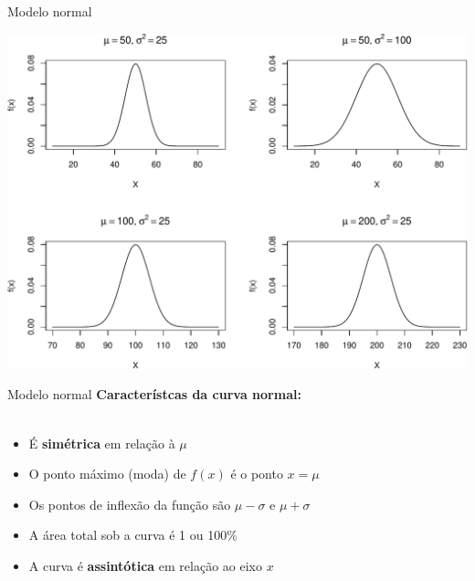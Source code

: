 \documentclass[10pt]{beamer}\usepackage[]{graphicx}\usepackage[]{color}
\newenvironment{knitrout}{}{} %
\theoremstyle{definition}
\begin{document}
\begin{frame}[fragile]{Modelo normal}
\begin{knitrout}\footnotesize
{}\color{fgcolor}

{\centering \includegraphics[width=1\textwidth]{figure/unnamed-chunk-5-1} 

}



\end{knitrout}
\end{frame}

\begin{frame}[fragile]{Modelo normal}
  \textbf{Característcas da curva normal:} \\~\\
  \begin{itemize}
  \item É \textbf{simétrica} em relação à $\mu$
  \item O ponto máximo (moda) de $f(x)$ é o ponto $x=\mu$
  \item Os pontos de inflexão da função são $\mu-\sigma$ e $\mu+\sigma$
  \item A área total sob a curva é 1 ou 100\%
  \item A curva é \textbf{assintótica} em relação ao eixo $x$
  \end{itemize}
\end{frame}
\end{document}
